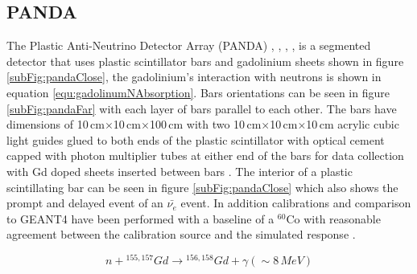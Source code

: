 \subsection{PANDA}
The Plastic Anti-Neutrino Detector Array (PANDA) \cite{PANDA_2012}, \cite{PANDA_2014}, \cite{PANDA_tgf}, \cite{IIRIE_Panda_2021}, is a segmented detector that uses plastic scintillator bars and gadolinium sheets shown in figure \ref{subFig:pandaClose}, the gadolinium's interaction with neutrons is shown in equation \ref{equ:gadolinumNAbsorption}. Bars orientations can be seen in figure \ref{subFig:pandaFar} with each layer of bars parallel to each other. The bars have dimensions of 10\,cm$\times$10\,cm$\times$100\,cm with two 10\,cm$\times$10\,cm$\times$10\,cm acrylic cubic light guides glued to both ends of the plastic scintillator with optical cement capped with photon multiplier tubes at either end of the bars for data collection with Gd doped sheets inserted between bars \cite{PANDA_2014}. The interior of a plastic scintillating bar can be seen in figure \ref{subFig:pandaClose} which also shows the prompt and delayed event of an $\bar{\nu_e}$ event. In addition calibrations and comparison to GEANT4 \cite{Agostinelli:2002hh} have been performed with a baseline of a $^{60}$Co with reasonable agreement between the calibration source and the simulated response \cite{PANDA_2012}. 

\begin{equation}
n + {^{155,157}Gd} \rightarrow {^{156,158} Gd} + \gamma (\sim 8\,MeV)
\label{equ:gadolinumNAbsorption}
\end{equation}

